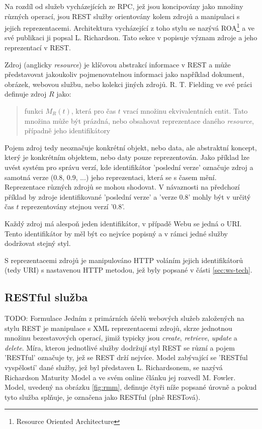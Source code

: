 \documentclass[czech,DP]{thesiskiv}
\begin{document}
Na rozdíl od služeb vycházejících ze RPC, jež jsou koncipovány jako množiny různých operací, jsou REST služby orientovány kolem zdrojů a manipulaci s jejich reprezentacemi. Architektura vycházející z toho stylu se nazývá ROA\footnote{Resource Oriented Architecture} a ve své publikaci\cite{restfulWebServices} ji popsal L. Richardson. Tato sekce v popisuje význam zdroje a jeho reprezentací v REST.

Zdroj (anglicky \textit{resource}) je klíčovou abstrakcí informace v REST a může představovat jakoukoliv pojmenovatelnou informaci jako například dokument, obrázek, webovou službu, nebo  kolekci jiných zdrojů. R. T. Fielding ve své práci\cite{fielding2000rest} definuje zdroj $R$ jako: 

\begin{quote}
	funkci $M_R(t)$, která pro čas $t$ vrací množinu ekvivalentních entit. Tato množina může být prázdná, nebo obsahovat reprezentace daného \textit{resource}, případně jeho identifikátory
\end{quote}

Pojem zdroj tedy neoznačuje konkrétní objekt, nebo data, ale abstraktní koncept, který je konkrétním objektem, nebo daty pouze reprezentován. Jako příklad lze uvést systém pro správu verzí, kde identifikátor 'poslední verze' označuje zdroj a samotná verze (0.8, 0.9, ...) jeho reprezentaci, která se s časem mění. Reprezentace různých zdrojů se mohou shodovat. V návaznosti na předchozí příklad by zdroje identifikované 'poslední verze' a 'verze 0.8' mohly být v určitý čas $t$ reprezentovány stejnou verzí '0.8'. 

Každý zdroj má alespoň jeden identifikátor, v případě Webu se jedná o URI. Tento identifikátor by měl být co nejvíce popisný a v rámci jedné služby dodržovat stejný styl\cite{restfulWebServices}. 

S reprezentacemi zdrojů je manipulováno HTTP voláním jejich identifikátorů (tedy URI) s nastavenou HTTP metodou, jež byly popsané v části \ref{sec:ws-tech}.

\subsection{RESTful služba}

TODO: Formulace
Jedním z primárních účelů webových služeb založených na stylu REST je manipulace s XML reprezentacemi zdrojů, skrze jednotnou množinu bezestavových operací, jimiž typicky jsou  \textit{create}, \textit{retrieve}, \textit{update} a \textit{delete}\cite{w3cWsArch}. Míra, kterou jednotlivé služby dodržují styl REST se různí a pojem 'RESTful' označuje ty, jež se REST drží nejvíce. Model zabývající se 'RESTful vyspělostí' dané služby, jež byl představen L. Richardsonem, se nazývá Richardson Maturity Model a ve svém online článku \cite{restfulMaturity} jej rozvedl M. Fowler. Model, uvedený na obrázku \ref{fig:rmm}, definuje čtyři níže popsané úrovně a pokud tyto služba splňuje, je označena jako RESTful (plně RESTová).
\end{document}
